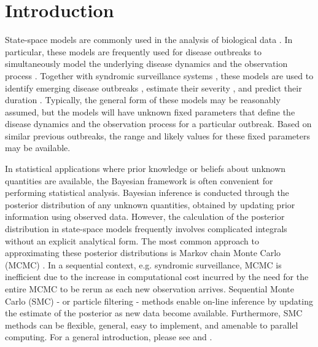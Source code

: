 \documentclass{elsarticle}
\begin{document}
\section{Introduction} \label{sec:intro}

State-space models are commonly used in the analysis of biological data \citep{tan2000estimation,kao2006application,skvortsov2012monitoring,saito2013extension}. In particular, these models are frequently used for disease outbreaks to simultaneously model the underlying disease dynamics and the observation process \citep{Mart:Cone:Lope:Lope:baye:2008, merl2009statistical, ludkovski2010optimal, skvortsov2012monitoring, unkel2012statistical}. Together with syndromic surveillance systems \citep{henning2004overview, wagner2006biosurveillance, wilson2006synsurveillance, hakenewerth2009north, Gins:Mohe:Pate:Bram:Smol:Bril:dete:2009}, these models are used to identify emerging disease outbreaks \citep{neill2006bayesian}, estimate their severity \citep{merl2009statistical}, and predict their duration \cite{ludkovski2010optimal}. Typically, the general form of these models may be reasonably assumed, but the models will have unknown fixed parameters that define the disease dynamics and the observation process for a particular outbreak. Based on similar previous outbreaks, the range and likely values for these fixed parameters may be available.

In statistical applications where prior knowledge or beliefs about unknown quantities are available, the Bayesian framework is often convenient for performing statistical analysis.  Bayesian inference is conducted through the posterior distribution of any unknown quantities, obtained by updating prior information using observed data. However, the calculation of the posterior distribution in state-space models frequently involves complicated integrals without an explicit analytical form. The most common approach to approximating these posterior distributions is Markov chain Monte Carlo (MCMC) \citep{Gelf:Smit:samp:1990}. In a sequential context, e.g. syndromic surveillance, MCMC is inefficient due to the increase in computational cost incurred by the need for the entire MCMC to be rerun as each new observation arrives. Sequential Monte Carlo (SMC) - or particle filtering - methods enable on-line inference by updating the estimate of the posterior as new data become available. Furthermore, SMC methods can be flexible, general, easy to implement, and amenable to parallel computing. For a general introduction, please see \cite{Douc:deFr:Gord:sequ:2001} and \cite{cappe2007overview}.
\end{document}
